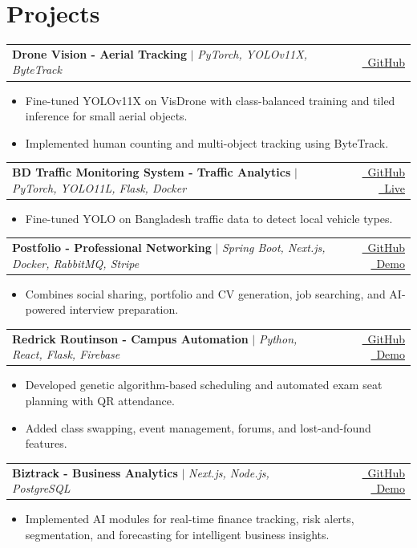 \documentclass{resume}
\makeatletter
\newcommand{\projectheading}[4]{%
  \begin{tabularx}{\linewidth}{@{}X@{\hspace{1em}}r@{}}
    \textbf{#1 - #2} $|$ \emph{#3} & {\small #4}
  \end{tabularx}\vspace{-4pt}
}
\renewenvironment{rSection}[1]{
  \section{#1}
  \begin{list}{}{
      \setlength{\leftmargin}{0.2em}
  }
  \item[]
}{
  \end{list}
  \vspace{0pt}
}
\makeatother
\begin{document}
\begin{rSection}{Projects}
\projectheading{Drone Vision}{Aerial Tracking}{PyTorch, YOLOv11X, ByteTrack}{%
  \href{https://github.com/shufanshahi/droneVision}{\faGithub\ GitHub}%
}
\begin{itemize}
  \item Fine-tuned YOLOv11X on VisDrone with class-balanced training and tiled inference for small aerial objects.
  \item Implemented human counting and multi-object tracking using ByteTrack.
\end{itemize}

\projectheading{BD Traffic Monitoring System}{Traffic Analytics}{PyTorch, YOLO11L, Flask, Docker}{%
  \href{https://github.com/shufanshahi/bd-traffic-monitoring-system}{\faGithub\ GitHub}
  \quad
  \href{https://huggingface.co/spaces/shufanshahi/bd-traffic-monitoring-system}{\faRocket\ Live}%
}
\begin{itemize}
  \item Fine-tuned YOLO on Bangladesh traffic data to detect local vehicle types.
\end{itemize}

\projectheading{Postfolio}{Professional Networking}{Spring Boot, Next.js, Docker, RabbitMQ, Stripe}{%
  \href{https://github.com/shufanshahi/Postfolio}{\faGithub\ GitHub}
  \quad
  \href{https://www.youtube.com/watch?v=U6N-ioqvg9c}{\faYoutube\ Demo}%
}
\begin{itemize}
  \item Combines social sharing, portfolio and CV generation, job searching, and AI-powered interview preparation.
\end{itemize}

\projectheading{Redrick Routinson}{Campus Automation}{Python, React, Flask, Firebase}{%
  \href{https://github.com/shufanshahi/RedrickRoutinson}{\faGithub\ GitHub}
  \quad
  \href{https://www.youtube.com/watch?v=Fg-GkZrsIzw}{\faYoutube\ Demo}%
}
\begin{itemize}
  \item Developed genetic algorithm-based scheduling and automated exam seat planning with QR attendance.
  \item Added class swapping, event management, forums, and lost-and-found features.
\end{itemize}

\projectheading{Biztrack}{Business Analytics}{Next.js, Node.js, PostgreSQL}{%
  \href{https://github.com/shufanshahi/biztrack}{\faGithub\ GitHub}
  \quad
  \href{https://www.youtube.com/watch?v=STNoXqq8kQM}{\faYoutube\ Demo}%
}
\begin{itemize}
  \item Implemented AI modules for real-time finance tracking, risk alerts, segmentation, and forecasting for intelligent business insights.
\end{itemize}


\end{rSection}
\end{document}

